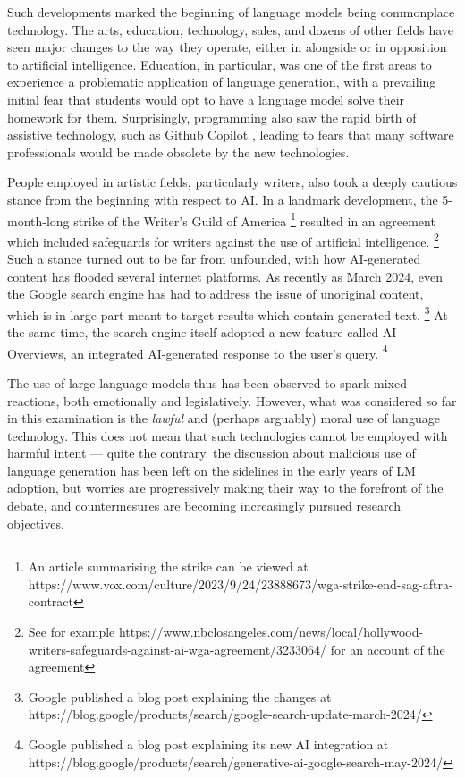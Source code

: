 Such developments marked the beginning of language models being commonplace technology.
The arts, education, technology, sales, and dozens of other fields have seen major changes to the way they operate, either in alongside or in opposition to artificial intelligence.
Education, in particular, was one of the first areas to experience a problematic application of language generation, with a prevailing initial fear that students would opt to have a language model solve their homework for them.
Surprisingly, programming also saw the rapid birth of assistive technology, such as Github Copilot \citep{citationneeded}, leading to fears that many software professionals would be made obsolete by the new technologies.

People employed in artistic fields, particularly writers, also took a deeply cautious stance from the beginning with respect to AI.
In a landmark development, the 5-month-long strike of the Writer's Guild of America
\footnote{An article summarising the strike can be viewed at https://www.vox.com/culture/2023/9/24/23888673/wga-strike-end-sag-aftra-contract}
resulted in an agreement which included safeguards for writers against the use of artificial intelligence.
\footnote{See for example https://www.nbclosangeles.com/news/local/hollywood-writers-safeguards-against-ai-wga-agreement/3233064/ for an account of the agreement}
Such a stance turned out to be far from unfounded, with how AI-generated content has flooded several internet platforms. \citep{citationneeded}
As recently as March 2024, even the Google search engine has had to address the issue of unoriginal content, which is in large part meant to target results which contain generated text.
\footnote{Google published a blog post explaining the changes at https://blog.google/products/search/google-search-update-march-2024/}
At the same time, the search engine itself adopted a new feature called AI Overviews, an integrated AI-generated response to the user's query.
\footnote{Google published a blog post explaining its new AI integration at https://blog.google/products/search/generative-ai-google-search-may-2024/}

The use of large language models thus has been observed to spark mixed reactions, both emotionally and legislatively. However, what was considered so far in this examination is the \emph{lawful} and (perhaps arguably) moral use of language technology.
This does not mean that such technologies cannot be employed with harmful intent --- quite the contrary. the discussion about malicious use of language generation has been left on the sidelines in the early years of LM adoption, but worries are progressively making their way to the forefront of the debate, and countermesures are becoming increasingly pursued research objectives.